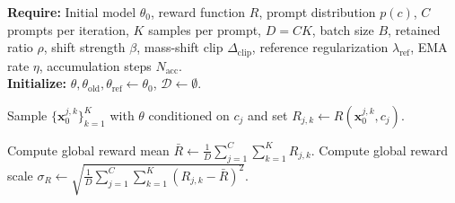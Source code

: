\begin{algorithm}[H]
    \scriptsize
    \setlength{\abovedisplayskip}{1pt}
    \setlength{\belowdisplayskip}{1pt}
    \renewcommand{\arraystretch}{0.9}
    \caption{Scheme B: Symmetric Hard Selection}
    \label{alg:x-prediction-symmetric-hard-selection}
    \textbf{Require:} Initial model $\theta_0$, reward function $R$,
    prompt distribution $p(c)$, $C$
    prompts per iteration, $K$ samples per prompt, $D=CK$, batch size $B$,
    retained ratio $\rho$, shift strength $\beta$, mass-shift clip
    $\Delta_{\mathrm{clip}}$, reference regularization $\lambda_{\mathrm{ref}}$,
    EMA rate $\eta$, accumulation steps $N_{\mathrm{acc}}$.\\
    \textbf{Initialize:}
    $\theta,\theta_{\mathrm{old}},\theta_{\mathrm{ref}}\leftarrow\theta_0$,
    $\mathcal{D}\leftarrow\emptyset$.
    \begin{algorithmic}[1]
                \State Sample $\{\mathbf{x}_0^{j,k}\}_{k=1}^{K}$ with $\theta$
                conditioned on $c_j$ and set
                $R_{j,k}\leftarrow R(\mathbf{x}_0^{j,k},c_j)$.

            \EndFor
            \State Compute global reward mean
            $\bar{R}\leftarrow \frac{1}{D}\sum_{j=1}^{C}\sum_{k=1}^{K}R_{j,k}$.
            \State Compute global reward scale
            $\sigma_R \leftarrow \sqrt{\frac{1}{D}\sum_{j=1}^{C}\sum_{k=1}^{K}(R_{j,k} - \bar{R})^2}.$



\end{algorithmic}
\end{algorithm}

